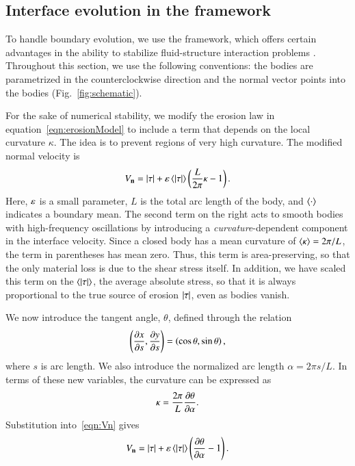 \documentclass[preprint, 10pt]{elsarticle}
\begin{document}
\subsection{Interface evolution in the {\thL} framework} 
\label{sec:thetaL}

To handle boundary evolution, we use the {\thL} framework, which offers
certain advantages in the ability to stabilize fluid-structure
interaction problems \cite{hou-low-she1994}. Throughout this section, we
use the following conventions: the bodies are parametrized in the
counterclockwise direction and the normal vector points into the bodies
(Fig.~\ref{fig:schematic}).

For the sake of numerical stability, we modify the erosion law in
equation~\eqref{eqn:erosionModel} to include a term that depends on the
local curvature $\kappa$. The idea is to prevent regions of very high
curvature. The modified normal velocity is 
\begin{align}
  \label{eqn:Vn}
  V_{\mathbf{n}} = \lvert \tau \rvert + \varepsilon \left< \lvert \tau \rvert \right> \left( \frac{L }{2\pi} \kappa - 1
  \right).
\end{align}
Here, $\varepsilon$ is a small parameter, $L$ is the total arc length of the
body, and $\left< \cdot \right>$ indicates a boundary mean. The second term on
the right acts to smooth bodies with high-frequency oscillations by
introducing a {\em curvature}-dependent component in the interface
velocity. Since a closed body has a mean curvature of $\left< \kappa \right> =
2\pi / L$, the term in parentheses has mean zero. Thus, this term is
area-preserving, so that the only material loss is due to the shear
stress itself. In addition, we have scaled this term on the
$\left< \lvert \tau \rvert \right>$, the average absolute stress, so that it is always
proportional to the true source of erosion $\lvert \tau \rvert$, even as bodies
vanish. 

We now introduce the tangent angle, $\theta$, defined through the relation
\begin{align*}
\left( \frac{\partial x}{\partial s}, \frac{\partial y}{\partial s} \right) = \left(\cos \theta, \sin
\theta \right),
\end{align*}
where $s$ is arc length. We also introduce the normalized arc length $\alpha = 2 \pi s / L$. In terms of these new variables, the curvature can be expressed as
\begin{align*}
\kappa = \frac{2 \pi}{L} \frac{\partial \theta}{\partial \alpha}.
\end{align*}
Substitution into~\eqref{eqn:Vn} gives
\begin{align}
\label{eqn:Vn2}
V_{\mathbf{n}} = \lvert \tau \rvert +  \varepsilon \left< \lvert \tau \rvert \right>   \left(\frac{\partial \theta}{\partial \alpha} - 1
\right).
\end{align}
\end{document}
